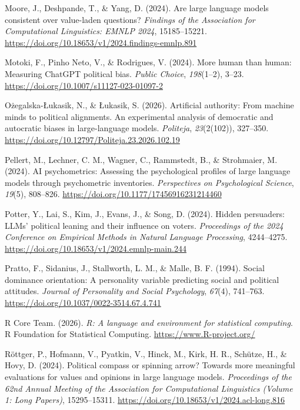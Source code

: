 \documentclass[
]{article}
\newlength{\cslhangindent}
\newenvironment{CSLReferences}[2] %
 {\begin{list}{}{%
  \setlength{\itemindent}{0pt}
  \setlength{\leftmargin}{0pt}
  \setlength{\parsep}{0pt}
  \ifodd #1
   \setlength{\leftmargin}{\cslhangindent}
   \setlength{\itemindent}{-1\cslhangindent}
  \fi
  \setlength{\itemsep}{#2\baselineskip}}}
 {\end{list}}
\begin{document}
\begin{CSLReferences}{1}{0}
Moore, J., Deshpande, T., \& Yang, D. (2024). Are large language models
consistent over value-laden questions? \emph{Findings of the Association
for Computational Linguistics: EMNLP 2024}, 15185--15221.
\url{https://doi.org/10.18653/v1/2024.findings-emnlp.891}

Motoki, F., Pinho Neto, V., \& Rodrigues, V. (2024). More human than
human: Measuring {ChatGPT} political bias. \emph{Public Choice},
\emph{198}(1--2), 3--23.
\url{https://doi.org/10.1007/s11127-023-01097-2}

Ożegalska-Łukasik, N., \& Łukasik, S. (2026). Artificial authority: From
machine minds to political alignments. {An} experimental analysis of
democratic and autocratic biases in large-language models.
\emph{Politeja}, \emph{23}(2(102)), 327--350.
\url{https://doi.org/10.12797/Politeja.23.2026.102.19}

Pellert, M., Lechner, C. M., Wagner, C., Rammstedt, B., \& Strohmaier,
M. (2024). {AI} psychometrics: Assessing the psychological profiles of
large language models through psychometric inventories.
\emph{Perspectives on Psychological Science}, \emph{19}(5), 808--826.
\url{https://doi.org/10.1177/17456916231214460}

Potter, Y., Lai, S., Kim, J., Evans, J., \& Song, D. (2024). Hidden
persuaders: {LLMs}' political leaning and their influence on voters.
\emph{Proceedings of the 2024 Conference on Empirical Methods in Natural
Language Processing}, 4244--4275.
\url{https://doi.org/10.18653/v1/2024.emnlp-main.244}

Pratto, F., Sidanius, J., Stallworth, L. M., \& Malle, B. F. (1994).
Social dominance orientation: A personality variable predicting social
and political attitudes. \emph{Journal of Personality and Social
Psychology}, \emph{67}(4), 741--763.
\url{https://doi.org/10.1037/0022-3514.67.4.741}

R Core Team. (2026). \emph{R: A language and environment for statistical
computing}. R Foundation for Statistical Computing.
\url{https://www.R-project.org/}

Röttger, P., Hofmann, V., Pyatkin, V., Hinck, M., Kirk, H. R., Schütze,
H., \& Hovy, D. (2024). Political compass or spinning arrow? {Towards}
more meaningful evaluations for values and opinions in large language
models. \emph{Proceedings of the 62nd Annual Meeting of the Association
for Computational Linguistics (Volume 1: Long Papers)}, 15295--15311.
\url{https://doi.org/10.18653/v1/2024.acl-long.816}


\end{CSLReferences}
\end{document}
